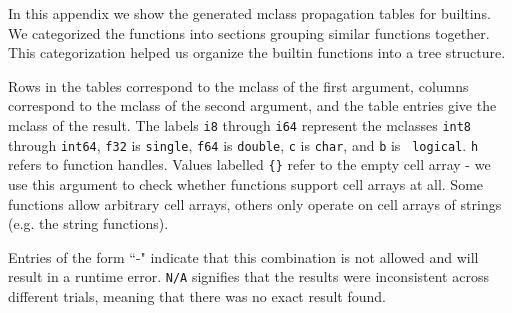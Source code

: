  \renewcommand{\tabcolsep}{3pt}
In this appendix we show the generated mclass propagation tables
for builtins. We categorized the functions into sections
grouping similar functions together. This categorization helped
us organize the builtin functions into a tree structure.

Rows in the tables 
correspond to the mclass of the first argument, columns correspond to
the mclass of the second argument, and the table entries give the mclass
of the result. The labels {\tt i8} through {\tt i64} represent the
mclasses {\tt int8} through {\tt int64}, {\tt f32} is {\tt single},
{\tt f64} is {\tt double}, {\tt c} is {\tt char}, and {\tt b} is {\tt
logical}. {\tt h} refers to function handles. Values labelled {\tt \{\}} refer to the
empty cell array - we use this argument to check whether functions
support cell arrays at all. Some functions allow arbitrary cell arrays,
others only operate on cell arrays of strings (e.g. the string functions).

Entries of the form ``-" indicate that this combination is
not allowed and will result in a runtime error. {\tt N/A} signifies
that the results were inconsistent across different trials, meaning
that there was no exact result found.



